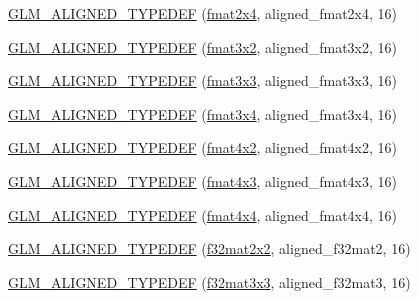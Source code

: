 \begin{DoxyCompactItemize}
\item 
\hyperlink{group__gtx__type__aligned_ga1a76b325fdf70f961d835edd182c63dd}{G\+L\+M\+\_\+\+A\+L\+I\+G\+N\+E\+D\+\_\+\+T\+Y\+P\+E\+D\+E\+F} (\hyperlink{group__gtc__type__precision_ga76578ee3c2d6de9b46d0efd1c7060b85}{fmat2x4}, aligned\+\_\+fmat2x4, 16)
\item 
\hyperlink{group__gtx__type__aligned_ga4b4e181cd041ba28c3163e7b8074aef0}{G\+L\+M\+\_\+\+A\+L\+I\+G\+N\+E\+D\+\_\+\+T\+Y\+P\+E\+D\+E\+F} (\hyperlink{group__gtc__type__precision_gab194ac1a68dbcb228384112ebe531c67}{fmat3x2}, aligned\+\_\+fmat3x2, 16)
\item 
\hyperlink{group__gtx__type__aligned_ga27b13f465abc8a40705698145e222c3f}{G\+L\+M\+\_\+\+A\+L\+I\+G\+N\+E\+D\+\_\+\+T\+Y\+P\+E\+D\+E\+F} (\hyperlink{group__gtc__type__precision_ga577209f19554f5291cc3d66dda9a4388}{fmat3x3}, aligned\+\_\+fmat3x3, 16)
\item 
\hyperlink{group__gtx__type__aligned_ga2608d19cc275830a6f8c0b6405625a4f}{G\+L\+M\+\_\+\+A\+L\+I\+G\+N\+E\+D\+\_\+\+T\+Y\+P\+E\+D\+E\+F} (\hyperlink{group__gtc__type__precision_gad68d9daa91ef05b29e80e044931837cf}{fmat3x4}, aligned\+\_\+fmat3x4, 16)
\item 
\hyperlink{group__gtx__type__aligned_ga93f09768241358a287c4cca538f1f7e7}{G\+L\+M\+\_\+\+A\+L\+I\+G\+N\+E\+D\+\_\+\+T\+Y\+P\+E\+D\+E\+F} (\hyperlink{group__gtc__type__precision_ga9325d382b334066a4c90a814c9040359}{fmat4x2}, aligned\+\_\+fmat4x2, 16)
\item 
\hyperlink{group__gtx__type__aligned_ga7c117e3ecca089e10247b1d41d88aff9}{G\+L\+M\+\_\+\+A\+L\+I\+G\+N\+E\+D\+\_\+\+T\+Y\+P\+E\+D\+E\+F} (\hyperlink{group__gtc__type__precision_ga89195b7b13a41b0f1d34a962d1f66bfb}{fmat4x3}, aligned\+\_\+fmat4x3, 16)
\item 
\hyperlink{group__gtx__type__aligned_ga07c75cd04ba42dc37fa3e105f89455c5}{G\+L\+M\+\_\+\+A\+L\+I\+G\+N\+E\+D\+\_\+\+T\+Y\+P\+E\+D\+E\+F} (\hyperlink{group__gtc__type__precision_ga16b508b75c7213ba6b24055ff3b7503d}{fmat4x4}, aligned\+\_\+fmat4x4, 16)
\item 
\hyperlink{group__gtx__type__aligned_ga65ff0d690a34a4d7f46f9b2eb51525ee}{G\+L\+M\+\_\+\+A\+L\+I\+G\+N\+E\+D\+\_\+\+T\+Y\+P\+E\+D\+E\+F} (\hyperlink{group__gtc__type__precision_gae7ebbb68656a5fd879d536b5d8452fb1}{f32mat2x2}, aligned\+\_\+f32mat2, 16)
\item 
\hyperlink{group__gtx__type__aligned_gadd8ddbe2bf65ccede865ba2f510176dc}{G\+L\+M\+\_\+\+A\+L\+I\+G\+N\+E\+D\+\_\+\+T\+Y\+P\+E\+D\+E\+F} (\hyperlink{group__gtc__type__precision_ga715b36ea1e2d1ffaaef7517cc78b3877}{f32mat3x3}, aligned\+\_\+f32mat3, 16)

\end{DoxyCompactItemize}
